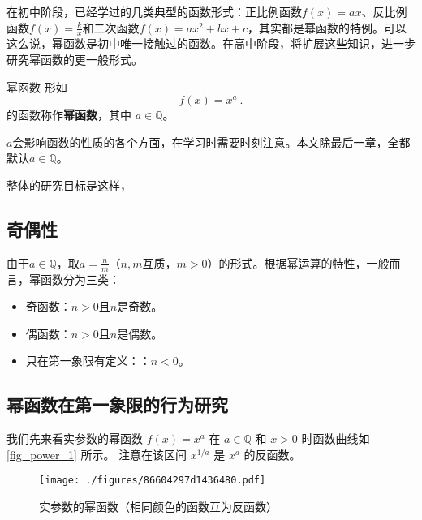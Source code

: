 
\begin{issues}
\issueDraft
\end{issues}


在初中阶段，已经学过的几类典型的函数形式：正比例函数$f(x) = ax$、反比例函数$f(x) = \frac{k}{x}$和二次函数$f(x) = ax^2+bx+c$，其实都是幂函数的特例。可以这么说，幂函数是初中唯一接触过的函数。在高中阶段，将扩展这些知识，进一步研究幂函数的更一般形式。

\begin{definition}{幂函数}
形如
\begin{equation}
f(x) = x^a~.
\end{equation}
的函数称作\textbf{幂函数}，其中 $a\in\mathbb Q$。
\end{definition}
$a$会影响函数的性质的各个方面，在学习时需要时刻注意。本文除最后一章，全都默认$a\in\mathbb Q$。


整体的研究目标是这样，

\subsection{奇偶性}

由于$a\in\mathbb Q$，取$\displaystyle a=\frac{n}{m}$（$n,m$互质，$m>0$）的形式。根据幂运算的特性，一般而言，幂函数分为三类：
\begin{itemize}
\item 奇函数：$n>0$且$n$是奇数。
\item 偶函数：$n>0$且$n$是偶数。
\item 只在第一象限有定义：：$n<0$。
\end{itemize}

\subsection{幂函数在第一象限的行为研究}


我们先来看实参数的幂函数 $f(x) = x^a$ 在 $a\in\mathbb Q$ 和 $x > 0$ 时函数曲线如\autoref{fig_power_1} 所示。 注意在该区间 $x^{1/a}$ 是 $x^a$ 的反函数。

\begin{figure}[ht]
\centering
\texttt{[image: ./figures/86604297d1436480.pdf]}
\caption{实参数的幂函数（相同颜色的函数互为反函数）}\label{fig_power_1}
\end{figure}

